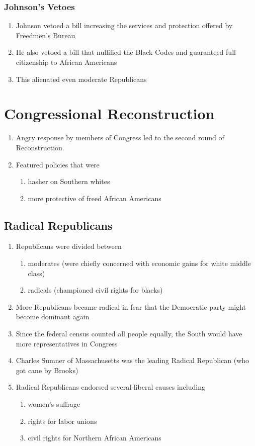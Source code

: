 \documentclass[12pt]{article} %
\begin{document}
\subsubsection{Johnson's Vetoes}
\begin{enumerate}
	\item Johnson vetoed a bill increasing the services and protection offered by Freedmen's Bureau
	\item He also vetoed a bill that nullified the Black Codes and guaranteed full citizenship to 
		African Americans
	\item This alienated even moderate Republicans 
\end{enumerate}

\section{Congressional Reconstruction}
\begin{enumerate}
	\item Angry response by members of Congress led to the second round of Reconstruction.
	\item Featured policies that were
	\begin{enumerate}
		\item hasher on Southern whites
		\item more protective of freed African Americans
	\end{enumerate}
\end{enumerate}

\subsection{Radical Republicans}
\begin{enumerate}
	\item Republicans were divided between
	\begin{enumerate}
		\item moderates (were chiefly concerned with economic gains for white middle class)
		\item radicals (championed civil rights for blacks)
	\end{enumerate}
	\item More Republicans became radical in fear that the Democratic party might become dominant
		again
	\item Since the federal census counted all people equally, the South would have more 
		representatives in Congress
	\item Charles Sumner of Massachusetts was the leading Radical Republican (who got cane by Brooks)
	\item Radical Republicans endorsed several liberal causes including
	\begin{enumerate}
		\item women's suffrage
		\item rights for labor unions
		\item civil rights for Northern African Americans
	\end{enumerate}
\end{enumerate}
\end{document}
